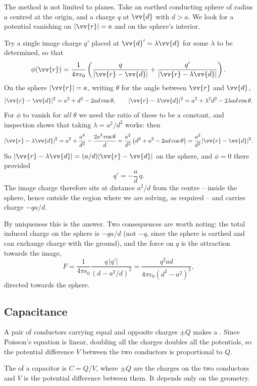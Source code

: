 \begin{example}
	The method is not limited to planes. Take an earthed conducting sphere of radius $a$ centred at the origin, and a charge $q$ at $\vv{d}$ with $d > a$. We look for a potential vanishing on $|\vv{r}| = a$ and on the sphere's interior.

	Try a single image charge $q'$ placed at $\vv{d}' = \lambda \vv{d}$ for some $\lambda$ to be determined, so that
	$$
	\phi(\vv{r}) = \frac{1}{4\pi\epsilon_0}\left(\frac{q}{|\vv{r}-\vv{d}|} + \frac{q'}{|\vv{r}-\lambda \vv{d}|}\right).
	$$
	On the sphere $|\vv{r}| = a$, writing $\theta$ for the angle between $\vv{r}$ and $\vv{d}$,
	$$
	|\vv{r}-\vv{d}|^2 = a^2 + d^2 - 2ad\cos\theta, \qquad |\vv{r}-\lambda\vv{d}|^2 = a^2 + \lambda^2 d^2 - 2\lambda a d \cos\theta.
	$$
	For $\phi$ to vanish for \emph{all} $\theta$ we need the ratio of these to be a constant, and inspection shows that taking $\lambda = a^2/d^2$ works: then
	$$
	|\vv{r}-\lambda\vv{d}|^2 = a^2 + \frac{a^4}{d^2} - \frac{2a^3\cos\theta}{d} = \frac{a^2}{d^2}\left(d^2 + a^2 - 2ad\cos\theta\right) = \frac{a^2}{d^2}|\vv{r}-\vv{d}|^2.
	$$
	So $|\vv{r}-\lambda\vv{d}| = (a/d)|\vv{r}-\vv{d}|$ on the sphere, and $\phi = 0$ there provided
	$$
	q' = -\frac{a}{d}\,q.
	$$
	The image charge therefore sits at distance $a^2/d$ from the centre -- inside the sphere, hence outside the region where we are solving, as required -- and carries charge $-qa/d$.

	By uniqueness this is the answer. Two consequences are worth noting: the total induced charge on the sphere is $-qa/d$ (not $-q$, since the sphere is earthed and can exchange charge with the ground), and the force on $q$ is the attraction towards the image,
	$$
	F = \frac{1}{4\pi\epsilon_0}\frac{q\,|q'|}{(d - a^2/d)^2} = \frac{q^2 a d}{4\pi\epsilon_0 (d^2-a^2)^2},
	$$
	directed towards the sphere.
\end{example}

\subsection{Capacitance}

A pair of conductors carrying equal and opposite charges $\pm Q$ makes a . Since Poisson's equation is linear, doubling all the charges doubles all the potentials, so the potential difference $V$ between the two conductors is proportional to $Q$.

\begin{definition}[Capacitance]
	The  of a capacitor is $C = Q/V$, where $\pm Q$ are the charges on the two conductors and $V$ is the potential difference between them. It depends only on the geometry.
\end{definition}

